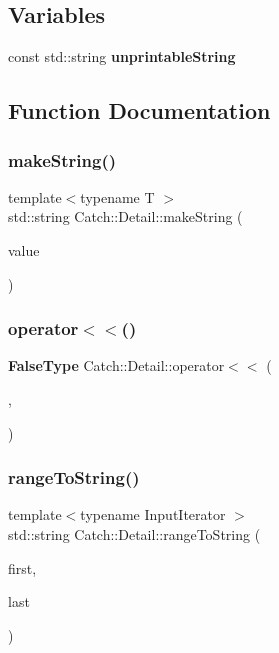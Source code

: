 \subsection*{Variables}
\begin{DoxyCompactItemize}
\item 
const std\+::string \textbf{ unprintable\+String}
\end{DoxyCompactItemize}


\subsection{Function Documentation}
\mbox{\label{namespace_catch_1_1_detail_aef46b4178e08758524d25d1d969a503c}} 
\subsubsection{make\+String()}
{\footnotesize\ttfamily template$<$typename T $>$ \\
std\+::string Catch\+::\+Detail\+::make\+String (\begin{DoxyParamCaption}\item[{T const \&}]{value }\end{DoxyParamCaption})}

\mbox{\label{namespace_catch_1_1_detail_ae9a44d574c4fbd18fabaaee05a433d88}} 
\subsubsection{operator$<$$<$()}
{\footnotesize\ttfamily \textbf{ False\+Type} Catch\+::\+Detail\+::operator$<$$<$ (\begin{DoxyParamCaption}\item[{std\+::ostream const \&}]{,  }\item[{\textbf{ Borg\+Type} const \&}]{ }\end{DoxyParamCaption})}

\mbox{\label{namespace_catch_1_1_detail_a6650a1dff325bf29962ff15ae73fd972}} 
\subsubsection{range\+To\+String()}
{\footnotesize\ttfamily template$<$typename Input\+Iterator $>$ \\
std\+::string Catch\+::\+Detail\+::range\+To\+String (\begin{DoxyParamCaption}\item[{Input\+Iterator}]{first,  }\item[{Input\+Iterator}]{last }\end{DoxyParamCaption})}

